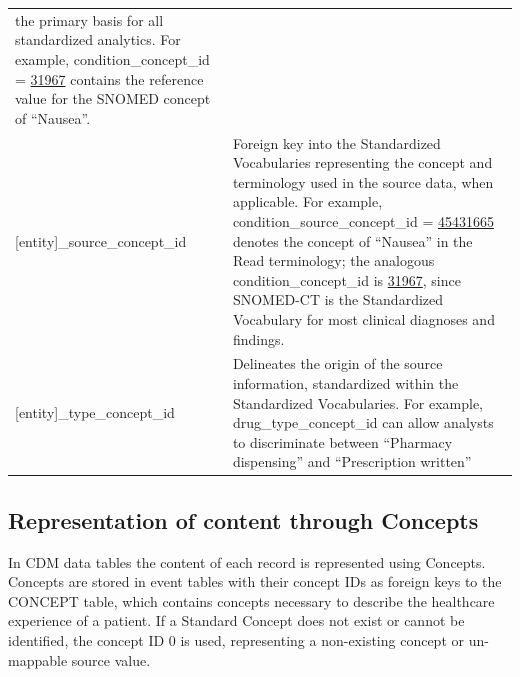 \documentclass[11pt]{book}
\begin{document}
\begin{longtable}[]{@{}ll@{}}
\begin{minipage}[t]{0.61\columnwidth}
the primary basis for all standardized analytics. For example,
condition\_concept\_id =
\href{http://athena.ohdsi.org/search-terms/terms/31967}{31967} contains
the reference value for the SNOMED concept of ``Nausea''.\strut
\end{minipage}\tabularnewline
\begin{minipage}[t]{0.34\columnwidth}\raggedright\strut
{[}entity{]}\_source\_concept\_id\strut
\end{minipage} & \begin{minipage}[t]{0.61\columnwidth}\raggedright\strut
Foreign key into the Standardized Vocabularies representing the concept
and terminology used in the source data, when applicable. For example,
condition\_source\_concept\_id =
\href{http://athena.ohdsi.org/search-terms/terms/45431665}{45431665}
denotes the concept of ``Nausea'' in the Read terminology; the analogous
condition\_concept\_id is
\href{http://athena.ohdsi.org/search-terms/terms/31967}{31967}, since
SNOMED-CT is the Standardized Vocabulary for most clinical diagnoses and
findings.\strut
\end{minipage}\tabularnewline
\begin{minipage}[t]{0.34\columnwidth}\raggedright\strut
{[}entity{]}\_type\_concept\_id\strut
\end{minipage} & \begin{minipage}[t]{0.61\columnwidth}\raggedright\strut
Delineates the origin of the source information, standardized within the
Standardized Vocabularies. For example, drug\_type\_concept\_id can
allow analysts to discriminate between ``Pharmacy dispensing'' and
``Prescription written''\strut
\end{minipage}\tabularnewline
\bottomrule
\end{longtable}

\subsection{Representation of content through
Concepts}\label{representation-of-content-through-concepts}

In CDM data tables the content of each record is represented using
Concepts. Concepts are stored in event tables with their concept IDs as
foreign keys to the CONCEPT table, which contains concepts necessary to
describe the healthcare experience of a patient. If a Standard Concept
does not exist or cannot be identified, the concept ID 0 is used,
representing a non-existing concept or un-mappable source value.
\end{document}
